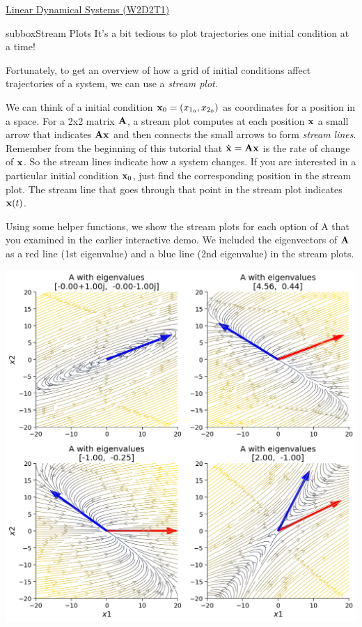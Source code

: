 \begin{textbox}{\href{https://compneuro.neuromatch.io/tutorials/W2D2_LinearSystems/student/W2D2_Tutorial1.html}{Linear Dynamical Systems (W2D2T1)} }
\begin{subbox}{subbox}{Stream Plots}
\scriptsize
It's a bit tedious to plot trajectories one initial condition at a time!

Fortunately, to get an overview of how a grid of initial conditions affect trajectories of a system, we can use a \textit{stream plot}. 

We can think of a initial condition ${\bf x}_0=(x_{1_0},x_{2_0})$  as coordinates for a position in a space. For a 2x2 matrix $\bf A$, a stream plot computes at each position $\bf x$ a small arrow that indicates $\bf Ax$ and then connects the small arrows to form \textit{stream lines}. Remember from the beginning of this tutorial that $\dot {\bf x} = \bf Ax$ is the rate of change of $\bf x$. So the stream lines indicate how a system changes. If you are interested in a particular initial condition ${\bf x}_0$, just find the corresponding position in the stream plot. The stream line that goes through that point in the stream plot indicates ${\bf x}(t)$.

Using some helper functions, we show the stream plots for each option of A that you examined in the earlier interactive demo. We included the eigenvectors of $\bf A$ as a red line (1st eigenvalue) and a blue line (2nd eigenvalue) in the stream plots.

\centering
\includegraphics[scale=0.2]{Figures/LS/LSFigure3.png}
\end{subbox}
\end{textbox}
